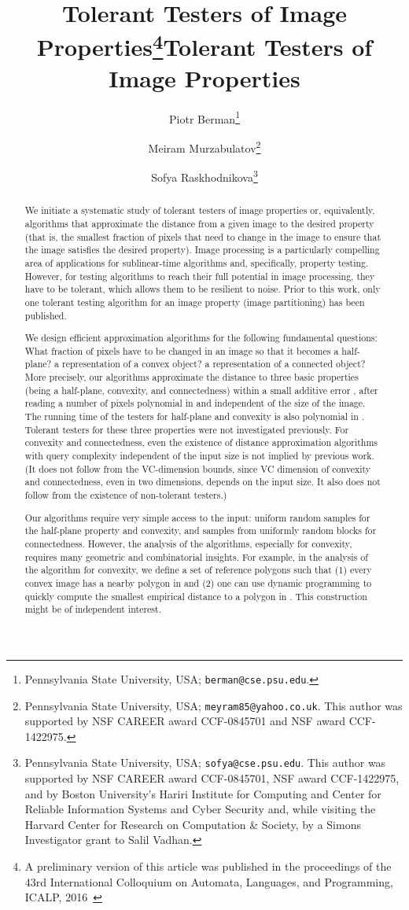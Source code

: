 \documentclass[11pt,english]{article}
\date{}
\title{Tolerant Testers of Image Properties\footnote{A preliminary version of this article was published in the proceedings of the 43rd International Colloquium on Automata, Languages, and Programming, ICALP, 2016~\cite{BMR16icalp}}}
\title{Tolerant Testers of Image Properties}
\author{Piotr Berman\thanks{Pennsylvania State University, USA; {\tt berman@cse.psu.edu}.}\\
\and Meiram Murzabulatov\thanks{Pennsylvania State University, USA; {\tt meyram85@yahoo.co.uk}. This author was supported by NSF CAREER award CCF-0845701 and NSF award CCF-1422975.
}\\
\and Sofya Raskhodnikova\thanks{Pennsylvania State University, USA; {\tt sofya@cse.psu.edu}. This author was supported by NSF CAREER award CCF-0845701, NSF award CCF-1422975, and by Boston University's Hariri Institute for Computing and Center for Reliable Information Systems and Cyber Security and, while visiting the Harvard Center for Research on Computation \& Society, by a Simons Investigator grant to Salil Vadhan.
}
}
\numberwithin{figure}{section}
\begin{document}
\raggedbottom
\setlength{\parskip}{0pt}
\maketitle
\begin{abstract}
We initiate a systematic study of tolerant testers of image properties or, equivalently, algorithms that approximate the distance from a given image to the desired property (that is, the smallest fraction of pixels that need to change in the image to ensure that the image satisfies the desired property). Image processing is a particularly compelling area of applications for sublinear-time algorithms and, specifically, property testing. However, for testing algorithms to reach their full potential in image processing, they have to be tolerant, which allows them to be resilient to noise. Prior to this work, only one tolerant testing algorithm for an image property (image partitioning) has been published.

We design efficient approximation algorithms for the following fundamental questions: What fraction of pixels have to be changed in an image so that it becomes a half-plane? a representation of a convex object? a representation of a connected object? More precisely, our algorithms approximate the distance to three basic properties (being a half-plane, convexity, and connectedness) within a small additive error , after reading a number of pixels polynomial in  and independent of the size of the image. The running time of the testers for half-plane and convexity is also polynomial in .
Tolerant testers for these three properties were not investigated previously. For convexity and connectedness, even the existence of distance approximation algorithms with query complexity independent of the input size is not implied by previous work. (It does not follow from the VC-dimension bounds, since VC dimension of convexity and connectedness, even in two dimensions, depends on the input size. It also does not follow from the existence of non-tolerant testers.)

Our algorithms require very simple access to the input: uniform random samples for the half-plane property and convexity, and samples from uniformly random blocks for connectedness. However, the analysis of the algorithms, especially for convexity, requires many geometric and combinatorial insights. For example, in the analysis of the algorithm for convexity, we define a set of reference polygons   such that (1) every convex image has a nearby polygon in  and (2) one can use dynamic programming to quickly compute the smallest empirical distance to a polygon in . This construction might be of independent interest.

\end{abstract}
\end{document}

